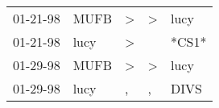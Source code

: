 \begin{supertabular}{p{0.07\textwidth}p{0.06\textwidth}p{0.02\textwidth}p{0.02\textwidth}p{0.06\textwidth}}
 01-21-98\textsuperscript{} &  MUFB\textsuperscript{} &  \textgreater &  \textgreater &  lucy\textsuperscript{} \\
 01-21-98\textsuperscript{} &  lucy\textsuperscript{} &  \textgreater &               &                   *CS1* \\
 01-29-98\textsuperscript{} &  MUFB\textsuperscript{} &  \textgreater &  \textgreater &  lucy\textsuperscript{} \\
 01-29-98\textsuperscript{} &  lucy\textsuperscript{} &             , &             , &  DIVS\textsuperscript{} \\
\end{supertabular}
